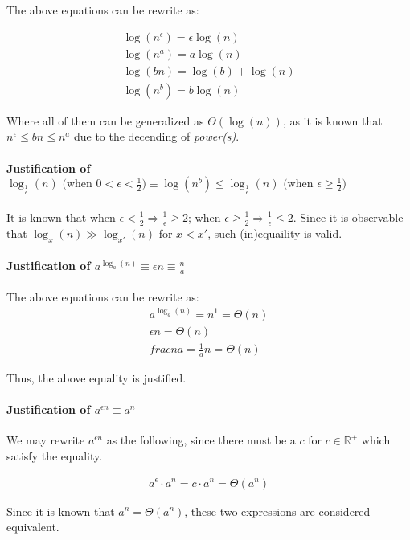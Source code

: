 \documentclass[12pt]{article}
\begin{document}
The above equations can be rewrite as:

\begin{gather}
    \log(n^\epsilon) = \epsilon \log(n) \\
    \log(n^a) = a \log(n) \\
    \log(bn) = \log(b) + \log(n) \\
    \log(n^b) = b \log(n)
\end{gather}

Where all of them can be generalized as $\Theta(\log(n))$, as it is known that $n^\epsilon \leq bn \leq n^a$ due to the decending of \textit{power(s)}.

\paragraph{Justification of $ \log_{\frac{1}{\epsilon}}(n) \text{ \ (when $0 < \epsilon < \frac{1}{2}$)} \equiv \log(n^b) \leq \log_{\frac{1}{\epsilon}}(n) \text{ \ (when $\epsilon \geq \frac{1}{2}$)}$\newline}


It is known that when $\epsilon < \frac{1}{2} \Rightarrow \frac{1}{\epsilon} \geq 2$; when $\epsilon \geq \frac{1}{2} \Rightarrow  \frac{1}{\epsilon} \leq 2$. Since it is observable that $\log_{x}(n) \gg \log_{x'}(n)$ for $x < x'$, such (in)equaility is valid.


\paragraph{Justification of $a^{\log_a(n)} \equiv \epsilon n \equiv \frac{n}{a}$\newline}

The above equations can be rewrite as:
\begin{gather}
    a^{\log_a(n)} = n^1 = \Theta(n) \\
    \epsilon n = \Theta(n) \\
    frac{n}{a} = \frac{1}{a}n =  \Theta(n)
\end{gather}

Thus, the above equality is justified.

\paragraph{Justification of $a^{\epsilon n} \equiv a^n$\newline}

We may rewrite $a^{\epsilon n}$ as the following, since there must be a $c$ for $c \in \mathbb{R^+}$ which satisfy the equality.

\begin{gather}
    a^{\epsilon} \cdot a^n = c \cdot a^n = \Theta(a^n)
\end{gather}

Since it is known that $a^n = \Theta(a^n)$, these two expressions are considered equivalent.

%
% 
% 
\end{document}
